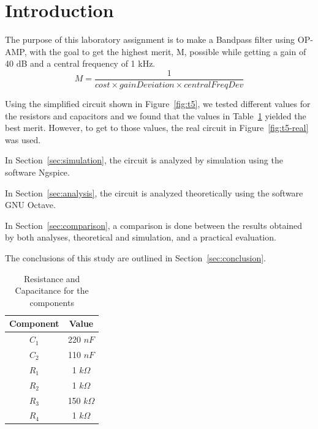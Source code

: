\section{Introduction}
\label{sec:introduction}

The purpose of this laboratory assignment is to make a Bandpass filter using OP-AMP, with the goal to get the highest merit, M, possible while getting a gain of 40 dB and a central frequency of 1 kHz.
$$ M = \frac{1}{cost \times gainDeviation \times centralFreqDev}$$

Using the simplified circuit shown in Figure~\ref{fig:t5}, we tested different values for the resistors and capacitors and we found that the values in Table~\ref{tab:values} yielded the best merit. However, to get to those values, the real circuit in Figure~\ref{fig:t5-real} was used.

In Section~\ref{sec:simulation}, the circuit is analyzed by simulation using the software Ngspice. 

In Section~\ref{sec:analysis}, the circuit is analyzed theoretically using the software GNU Octave. 

In Section~\ref{sec:comparison}, a comparison is done between the results obtained by both analyses, theoretical and simulation, and a practical evaluation.

The conclusions of this study are outlined in Section~\ref{sec:conclusion}.

\begin{table}[ht!]
    \centering
    \begin{tabular}{c c}
    \toprule
    Component & Value \\ \midrule
    $C_1$  & 220 $nF$      \\
    $C_2$  & 110 $nF$      \\
    $R_1$  & 1 $k\Omega$   \\
    $R_2$  & 1 $k\Omega$   \\
    $R_3$  & 150 $k\Omega$ \\
    $R_4$  & 1 $k\Omega$   \\ \bottomrule
    \end{tabular}
    \caption{Resistance and Capacitance for the components}
    \label{tab:values}
\end{table}

